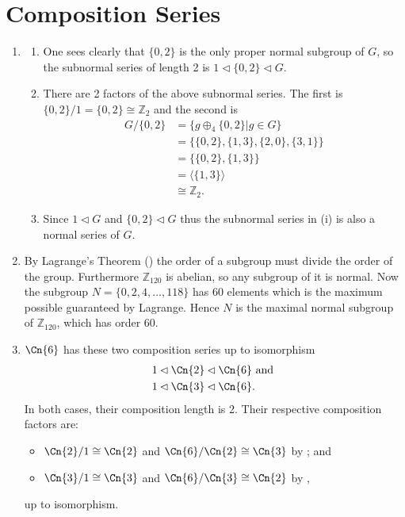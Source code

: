 \section{Composition Series}
\begin{enumerate}
    \item \begin{enumerate}[label=(\roman*)]
        \item One sees clearly that $\{0, 2\}$ is the only proper normal subgroup of $G$, so the subnormal series of length 2 is $1 \lhd \{0, 2\} \lhd G$.
        \item There are 2 factors of the above subnormal series. The first is $\{0, 2\} / 1 = \{0, 2\} \cong \mathbb{Z}_2$ and the second is
        \begin{align*}
            G / \{0, 2\} &= \{g \oplus_4 \{0, 2\} \vert g \in G\}\\
            &= \{\{0, 2\}, \{1, 3\}, \{2, 0\}, \{3, 1\}\}\\
            &= \{\{0, 2\}, \{1, 3\}\}\\
            &= \langle \{1, 3\} \rangle\\
            &\cong \mathbb{Z}_2.
        \end{align*}
        \item Since $1 \lhd G$ and $\{0, 2\} \lhd G$ thus the subnormal series in (i) is also a normal series of $G$.
    \end{enumerate}
    
    \item By Lagrange's Theorem () the order of a subgroup must divide the order of the group. Furthermore $\mathbb{Z}_{120}$ is abelian, so any subgroup of it is normal. Now the subgroup $N = \{0, 2, 4, \dots, 118\}$ has 60 elements which is the maximum possible guaranteed by Lagrange. Hence $N$ is the maximal normal subgroup of $\mathbb{Z}_{120}$, which has order 60.
    
    \item $\Cn{6}$ has these two composition series up to isomorphism
    \begin{align*}
        &1 \lhd \Cn{2} \lhd \Cn{6} \text{ and }\\
        &1 \lhd \Cn{3} \lhd \Cn{6}.
    \end{align*}
    In both cases, their composition length is 2. Their respective composition factors are:
    \begin{itemize}
        \item $\Cn{2} / 1 \cong \Cn{2}$ and $\Cn{6} / \Cn{2} \cong \Cn{3}$ by ; and
        \item $\Cn{3} / 1 \cong \Cn{3}$ and $\Cn{6} / \Cn{3} \cong \Cn{2}$ by ,
    \end{itemize}
    up to isomorphism.
    

\end{enumerate}
